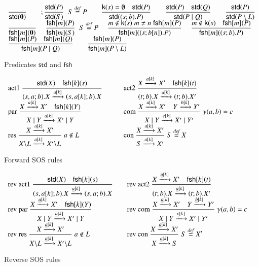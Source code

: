 \documentclass[review]{elsarticle}
\newcommand{\paral}{\; \vert \;}
\newcommand{\Rule}[2]{\displaystyle{\frac{#1}{#2}}}
\newcommand{\rom}[1]{\mbox{\rm{#1}}}
\newcommand{\Nil}{\mathbf{0}}
\newcommand{\std}[1]{\mathsf{std}(#1)}
\newcommand{\kkey}[1]{\mathsf{k}(#1)}
\newcommand{\fresh}[2]{\mathsf{fsh}[#1](#2)}
\newcommand{\bydef}{\stackrel{\emph{def}}{=}}
\begin{document}
\renewcommand{\arraystretch}{3}
\begin{figure}[t]
\[
\begin{array}{l}
\Rule
{}
{\std{\Nil}}
\qquad; 
\Rule
{\std{P}}
{\std{S}}
\;\;
S \bydef P
\qquad 
\Rule   
{\kkey{s}=\emptyset \quad  \std{P}}
{\std{(s;b).P}}
\qquad 
\Rule   
{\std{P} \quad \std{Q}}
{\std{P \paral Q}}
\qquad
\Rule   
{\std{P}}
{\std{P \setminus L}}
\\%
\Rule
{}
{\fresh{m}{\Nil}}
\quad \;
\Rule
{\fresh{m}{P}}
{\fresh{m}{S}}
\;\;
S \bydef P
\quad\; 
\Rule
{m \notin \kkey{s} \; m \neq n \; \fresh{m}{P}}
{\fresh{m}{(s;b[n]).P}}
\quad \;
\Rule
{m \notin \kkey{s} \quad \fresh{m}{P}}
{\fresh{m}{(s;b).P}}
\\%
\Rule
{\fresh{m}{P} \quad \fresh{m}{Q}}
{\fresh{m}{P \paral Q}}
\qquad
\Rule
{\fresh{m}{P}}
{\fresh{m}{P \setminus L}}
\end{array}
\]
\caption{Predicates $\mathsf{std}$ and $\mathsf{fsh}$} \label{fig:predicates}
\end{figure}

\begin{figure}[t] 
\[
\begin{array}{ll}
\rom{act1}\ 
\Rule
{\std{X} \quad \fresh{k}{s}}
{(s,a;b).X \xrightarrow{a[k]}(s,a[k];b).X}
\qquad &
\rom{act2}\
\Rule
{X \xrightarrow{a[k]} X' \quad \fresh{k}{t}}
{(t;b).X \xrightarrow{a[k]} (t;b).X'}
\\
\rom{par}\
\Rule
{X \xrightarrow{a[k]} X'\quad \fresh{k}{Y}}
{X \paral Y \xrightarrow{a[k]} X' \paral Y}
\qquad &
\rom{com}\
\Rule
{X \xrightarrow{a[k]} X' \quad Y \xrightarrow{b[k]} Y'}
{X \paral Y \xrightarrow{c[k]} X' \paral Y'}
\; \gamma(a,b)=c
%
\\
\rom{res}\
\Rule
{X \xrightarrow{a[k]} X'}
{X\backslash L \xrightarrow{a[k]} X'\backslash L}
\; a \notin L
\qquad &
\rom{con}\
\Rule
{X \xrightarrow{a[k]} X'}
{S \xrightarrow{a[k]} X'}
\; S \bydef X
\end{array}
\] 
\caption{Forward SOS rules} \label{fig:fsos}
\end{figure}

\begin{figure}[t]
\[
\begin{array}{ll}
\rom{rev act1}\
\Rule
{\std{X} \quad \fresh{k}{s}}
{(s,a[k];b).X \xrightarrow{\underline{a}[k]}(s,a;b).X}
\quad &
\rom{rev act2}\
\Rule
{X \xrightarrow{\underline{a}[k]} X' \quad \fresh{k}{t}}
{(t;b).X \xrightarrow{\underline{a}[k]} (t;b).X'}
\\
\rom{rev par}\
\Rule
{X \xrightarrow{\underline{a}[k]} X'\quad \fresh{k}{Y}}
{X \paral Y \xrightarrow{\underline{a}[k]} X' \paral Y}
\qquad &
\rom{rev com}\
\Rule
{X \xrightarrow{\underline{a}[k]} X' \quad Y \xrightarrow{\underline{b}[k]} Y'}
{X \paral Y \xrightarrow{\underline{c}[k]} X' \paral Y'}
\; \gamma(a,b)=c
%
\\
\rom{rev res}\
\Rule
{X \xrightarrow{\underline{a}[k]} X'}
{X\backslash L \xrightarrow{\underline{a}[k]} X'\backslash L}
\; a \notin L
\qquad &
\rom{rev con}\
\Rule
{X \xrightarrow{\underline{a}[k]} X'}
{X \xrightarrow{\underline{a}[k]} S}
\; S \bydef X'
\end{array}
\]
\caption{Reverse SOS rules } \label{fig:reversesos}
\end{figure}
\end{document}
